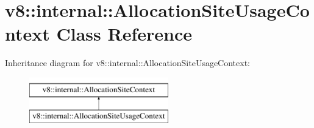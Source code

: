 \hypertarget{classv8_1_1internal_1_1AllocationSiteUsageContext}{}\section{v8\+:\+:internal\+:\+:Allocation\+Site\+Usage\+Context Class Reference}
\label{classv8_1_1internal_1_1AllocationSiteUsageContext}
Inheritance diagram for v8\+:\+:internal\+:\+:Allocation\+Site\+Usage\+Context\+:\begin{figure}[H]
\begin{center}
\leavevmode
\includegraphics[height=2.000000cm]{classv8_1_1internal_1_1AllocationSiteUsageContext}
\end{center}
\end{figure}
